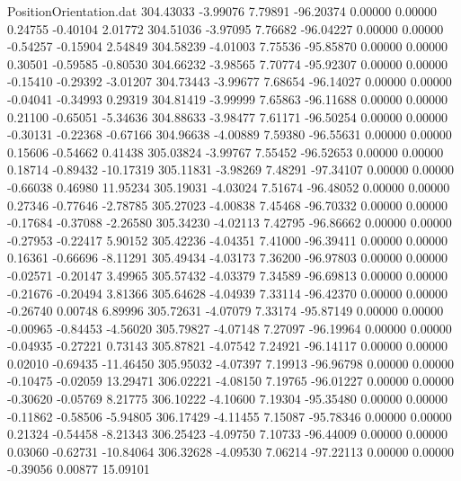\begin{filecontents}{PositionOrientation.dat}
 304.43033   -3.99076    7.79891   -96.20374    0.00000    0.00000    0.24755   -0.40104    2.01772
 304.51036   -3.97095    7.76682   -96.04227    0.00000    0.00000   -0.54257   -0.15904    2.54849
 304.58239   -4.01003    7.75536   -95.85870    0.00000    0.00000    0.30501   -0.59585   -0.80530
 304.66232   -3.98565    7.70774   -95.92307    0.00000    0.00000   -0.15410   -0.29392   -3.01207
 304.73443   -3.99677    7.68654   -96.14027    0.00000    0.00000   -0.04041   -0.34993    0.29319
 304.81419   -3.99999    7.65863   -96.11688    0.00000    0.00000    0.21100   -0.65051   -5.34636
 304.88633   -3.98477    7.61171   -96.50254    0.00000    0.00000   -0.30131   -0.22368   -0.67166
 304.96638   -4.00889    7.59380   -96.55631    0.00000    0.00000    0.15606   -0.54662    0.41438
 305.03824   -3.99767    7.55452   -96.52653    0.00000    0.00000    0.18714   -0.89432  -10.17319
 305.11831   -3.98269    7.48291   -97.34107    0.00000    0.00000   -0.66038    0.46980   11.95234
 305.19031   -4.03024    7.51674   -96.48052    0.00000    0.00000    0.27346   -0.77646   -2.78785
 305.27023   -4.00838    7.45468   -96.70332    0.00000    0.00000   -0.17684   -0.37088   -2.26580
 305.34230   -4.02113    7.42795   -96.86662    0.00000    0.00000   -0.27953   -0.22417    5.90152
 305.42236   -4.04351    7.41000   -96.39411    0.00000    0.00000    0.16361   -0.66696   -8.11291
 305.49434   -4.03173    7.36200   -96.97803    0.00000    0.00000   -0.02571   -0.20147    3.49965
 305.57432   -4.03379    7.34589   -96.69813    0.00000    0.00000   -0.21676   -0.20494    3.81366
 305.64628   -4.04939    7.33114   -96.42370    0.00000    0.00000   -0.26740    0.00748    6.89996
 305.72631   -4.07079    7.33174   -95.87149    0.00000    0.00000   -0.00965   -0.84453   -4.56020
 305.79827   -4.07148    7.27097   -96.19964    0.00000    0.00000   -0.04935   -0.27221    0.73143
 305.87821   -4.07542    7.24921   -96.14117    0.00000    0.00000    0.02010   -0.69435  -11.46450
 305.95032   -4.07397    7.19913   -96.96798    0.00000    0.00000   -0.10475   -0.02059   13.29471
 306.02221   -4.08150    7.19765   -96.01227    0.00000    0.00000   -0.30620   -0.05769    8.21775
 306.10222   -4.10600    7.19304   -95.35480    0.00000    0.00000   -0.11862   -0.58506   -5.94805
 306.17429   -4.11455    7.15087   -95.78346    0.00000    0.00000    0.21324   -0.54458   -8.21343
 306.25423   -4.09750    7.10733   -96.44009    0.00000    0.00000    0.03060   -0.62731  -10.84064
 306.32628   -4.09530    7.06214   -97.22113    0.00000    0.00000   -0.39056    0.00877   15.09101

\end{filecontents}
